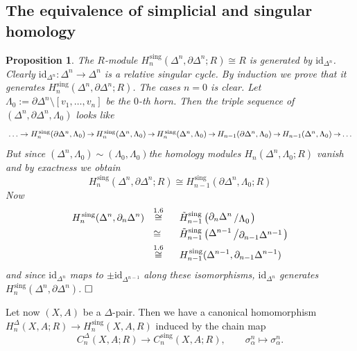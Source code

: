 \documentclass[11pt]{book}
\numberwithin{dummy}{section}
\newtheorem{proposition}[theorem]{Proposition}
\theoremstyle{nonumberbreak}
\newenvironment{pr}[1][]{\ifthenelse{\equal{#1}{}}{\proof}{\proof[#1]}\rm}{\endproof}
\newcommand{\la}{\longrightarrow}
\newcommand{\id}{\mathrm{id}}
\newcommand{\Cs}{C^{\hspace{1pt}\mathrm{sing}}}
\newcommand{\Hs}{H^{\hspace{1pt}\mathrm{sing}}}
\newcommand{\slant}[2]{{\raisebox{.1em}{$#1$}\left/\raisebox{-.1em}{$#2$}\right.}}
\begin{document}
\begin{spacing}{1.4}
\section{The equivalence of simplicial and singular homology} %




\begin{proposition}
The $R$-module $\Hs_n(\Delta^n, \partial \Delta^n;R) \cong R$ is generated by $\id_{\Delta^n}$.
\begin{pr}
Clearly $\id_{\Delta^n}: \Delta^n \la \Delta^n$ is a relative singular cycle. By induction we prove that it generates $\Hs_n(\Delta^n, \partial \Delta^n;R)$. The cases $n=0$ is clear.
Let $\Lambda_0:= \partial \Delta^n \setminus [v_1, \ldots, v_n]$ be the $0$-th horn. Then the triple sequence of $(\Delta^n, \partial \Delta^n,\Lambda_0)$ looks like
$$
\begin{xy}
\xymatrix@C=0.7em{
\ldots \rightarrow \Hs_n(\partial \Delta^n, \Lambda_0) \ar[r] & \Hs_n(\Delta^n, \Lambda_0) \ar[r] & \Hs_n(\Delta^n, \Lambda_0) \ar[r] & H_{n-1}(\partial \Delta^n, \Lambda_0) \ar[r] & H_{n-1}(\Delta^n, \Lambda_0) \ar[r] & \ldots
}
\end{xy}
$$
But since $(\Delta^n, \Lambda_0) \sim (\Lambda_0, \Lambda_0)$the homology modules $H_n(\Delta^n, \Lambda_0;R)$ vanish and by exactness we obtain
$$\Hs_n(\Delta^n, \partial \Delta^n;R) \cong \Hs_{n-1}(\partial \Delta^n, \Lambda_0;R)$$
Now
\begin{alignat*}{5}
\Hs_n(\Delta^n, \partial_n \Delta^n) \ \ &\overset{1.6}{\cong} && \ \ \tilde{H}^{\mathrm{sing}}_{n-1} \left( \slant{\partial_n \Delta^n}{\Lambda_0}\right)\\
&\cong && \ \ \tilde{H}^{\mathrm{sing}}_{n-1}\left(\slant{\Delta^{n-1}}{\partial_{n-1} \Delta^{n-1}}\right)\\
&\overset{1.6}{\cong} && \ \ \Hs_{n-1}(\Delta^{n-1}, \partial_{n-1} \Delta^{n-1})
\end{alignat*}
and since $\id_{\Delta^n}$ maps to $\pm \id_{\Delta^{n-1}}$ along these isomorphisms, $\id_{\Delta^n}$ generates $\Hs_n(\Delta^n, \partial \Delta^n)$. $\hfill \Box$


\end{pr}
\end{proposition}



Let now $(X,A)$ be a $\Delta$-pair. Then we have a canonical homomorphism $H^{\Delta}_n(X,A;R) \la \Hs_n(X,A,R)$ induced by the chain map
$$C^{\Delta}_n(X,A;R) \la \Cs_n(X,A;R), \qquad \sigma_{\alpha}^n \mapsto \sigma_{\alpha}^n.$$


\end{spacing}
\end{document}
